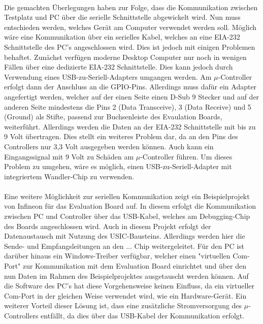 \paragraph{}
Die gemachten Überlegungen haben zur Folge, dass die Kommunikation zwischen Testplatz und PC über die serielle Schnittstelle abgewickelt wird. Nun muss entschieden werden, welches Gerät am Computer verwendet werden soll. Möglich wäre eine Kommunikation über ein serielles Kabel, welches an eine EIA-232 Schnittstelle des PC's angeschlossen wird. Dies ist jedoch mit einigen Problemen behaftet. Zunächst verfügen moderne Desktop Computer nur noch in wenigen Fällen über eine dedizierte EIA-232 Schnittstelle. Dies kann jedoch durch Verwendung eines USB-zu-Seriell-Adapters umgangen werden. Am $\mu$-Controller erfolgt dann der Anschluss an die GPIO-Pins. Allerdings muss dafür ein Adapter angefertigt werden, welcher auf der einen Seite einen D-Sub 9 Stecker und auf der anderen Seite mindestens die Pins 2 (Data Transceive), 3 (Data Receive) und 5 (Ground) als Stifte, passend zur Buchsenleiste des Evaulation Boards, weiterführt. Allerdings werden die Daten an der EIA-232 Schnittstelle mit bis zu 9 Volt übertragen. Dies stellt ein weiteres Problem dar, da an den Pins des Controllers nur 3,3 Volt ausgegeben werden können. Auch kann ein Eingangssignal mit 9 Volt zu Schäden am $\mu$-Controller führen. Um dieses Problem zu umgehen, wäre es möglich, einen USB-zu-Seriell-Adapter mit integriertem Wandler-Chip zu verwenden.
\paragraph{}
Eine weitere Möglichkeit zur seriellen Kommunikation zeigt ein Beispielprojekt von Infineon für das Evaluation Board auf. In diesem erfolgt die Kommunikation zwischen PC und Controller über das USB-Kabel, welches am Debugging-Chip des Boards angeschlossen wird. Auch in diesem Projekt erfolgt der Datenaustausch mit Nutzung des USIC-Bausteins. Allerdings werden hier die Sende- und Empfangsleitungen an den ... Chip weitergeleitet. Für den PC ist darüber hinaus ein Windows-Treiber verfügbar, welcher einen "virtuellen Com-Port" zur Kommunikation mit dem Evaluation Board einrichtet und über den nun Daten im Rahmen des Beispielprojektes ausgetauscht werden können. Auf die Software des PC's hat diese Vorgehensweise keinen Einfluss, da ein virtueller Com-Port in der gleichen Weise verwendet wird, wie ein Hardware-Gerät. Ein weiterer Vorteil dieser Lösung ist, dass eine zusätzliche Stromversorgung des $\mu$-Controllers entfällt, da dies über das USB-Kabel der Kommunikation erfolgt.
